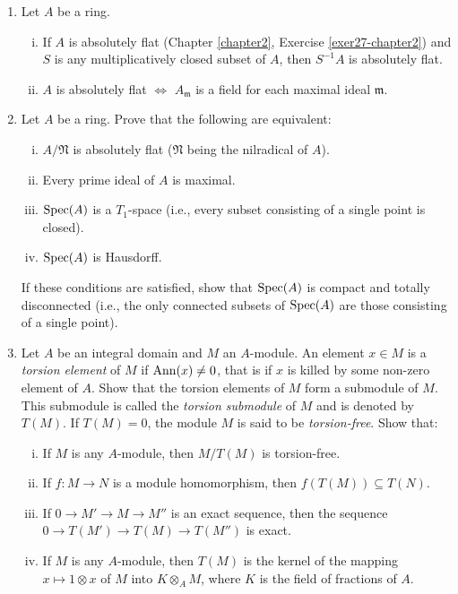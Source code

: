 \begin{enumerate}
    \item \label{exer10-chapter3} Let $A$ be a ring.
    \begin{enumerate}[i)]
        \item If $A$ is absolutely flat (Chapter \ref{chapter2}, Exercise \ref{exer27-chapter2}) and $S$ is any multiplicatively closed subset of $A$, then $S^{-1}A$ is absolutely flat.
        \item $A$ is absolutely flat $\iff$ $A_{\mathfrak{m}}$ is a field for each maximal ideal $\mathfrak{m}$.
    \end{enumerate}

    \item \label{exer11-chapter3} Let $A$ be a ring. Prove that the following are equivalent:
    \begin{enumerate}[i)]
        \item $A/\mathfrak{N}$ is absolutely flat ($\mathfrak{N}$ being the nilradical of $A$).
        \item Every prime ideal of $A$ is maximal.
        \item $\operatorname{Spec}(A)$ is a $T_1$-space (i.e., every subset consisting of a single point is closed).
        \item $\operatorname{Spec}(A)$ is Hausdorff.
    \end{enumerate}
    If these conditions are satisfied, show that $\operatorname{Spec}(A)$ is compact and totally disconnected (i.e., the only connected subsets of $\operatorname{Spec}(A)$ are those consisting of a single point).

    \item \label{exer12-chapter3} Let $A$ be an integral domain and $M$ an $A$-module. An element $x \in M$ is a \emph{torsion element} of $M$ if $\operatorname{Ann}(x) \neq 0$, that is if $x$ is killed by some non-zero element of $A$. Show that the torsion elements of $M$ form a submodule of $M$. This submodule is called the \emph{torsion submodule} of $M$ and is denoted by $T(M)$. If $T(M) = 0$, the module $M$ is said to be \emph{torsion-free}. Show that:
    \begin{enumerate}[i)]
        \item If $M$ is any $A$-module, then $M/T(M)$ is torsion-free.
        \item If $f \colon M \to N$ is a module homomorphism, then $f(T(M)) \subseteq T(N)$.
        \item If $0 \to M' \to M \to M''$ is an exact sequence, then the sequence $0 \to T(M') \to T(M) \to T(M'')$ is exact.
        \item If $M$ is any $A$-module, then $T(M)$ is the kernel of the mapping $x \mapsto 1 \otimes x$ of $M$ into $K \otimes_A M$, where $K$ is the field of fractions of $A$.
        

\end{enumerate}
\end{enumerate}
